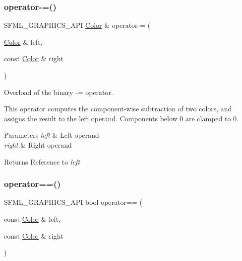 \subsubsection{\texorpdfstring{operator-\/=()}{operator-=()}}
{\footnotesize\ttfamily S\+F\+M\+L\+\_\+\+G\+R\+A\+P\+H\+I\+C\+S\+\_\+\+A\+PI \mbox{\hyperlink{classsf_1_1_color}{Color}} \& operator-\/= (\begin{DoxyParamCaption}\item[{\mbox{\hyperlink{classsf_1_1_color}{Color}} \&}]{left,  }\item[{const \mbox{\hyperlink{classsf_1_1_color}{Color}} \&}]{right }\end{DoxyParamCaption})\hspace{0.3cm}{\ttfamily [related]}}



Overload of the binary -\/= operator. 

This operator computes the component-\/wise subtraction of two colors, and assigns the result to the left operand. Components below 0 are clamped to 0.


\begin{DoxyParams}{Parameters}
{\em left} & Left operand \\
\hline
{\em right} & Right operand\\
\hline
\end{DoxyParams}
\begin{DoxyReturn}{Returns}
Reference to {\itshape left} \begin{DoxyVerb}\end{DoxyVerb}
 
\end{DoxyReturn}
\mbox{\label{classsf_1_1_color_a7498d4670c7655e8d4d91ef49cc6064e}} 
\subsubsection{\texorpdfstring{operator==()}{operator==()}}
{\footnotesize\ttfamily S\+F\+M\+L\+\_\+\+G\+R\+A\+P\+H\+I\+C\+S\+\_\+\+A\+PI bool operator== (\begin{DoxyParamCaption}\item[{const \mbox{\hyperlink{classsf_1_1_color}{Color}} \&}]{left,  }\item[{const \mbox{\hyperlink{classsf_1_1_color}{Color}} \&}]{right }\end{DoxyParamCaption})\hspace{0.3cm}{\ttfamily [related]}}



